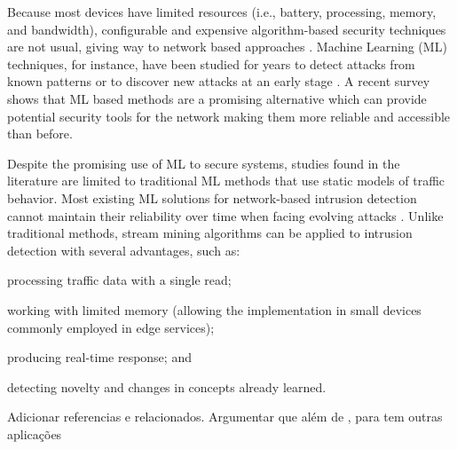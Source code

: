 Because most \iot devices have limited resources (i.e., battery, processing,
memory, and bandwidth), configurable and expensive algorithm-based
security techniques are not usual, giving way to network based approaches 
\cite{Zhou2017}.
Machine Learning (ML) techniques, for instance, have been studied for years to detect attacks
from known patterns or to discover new attacks at an early stage
\cite{buczak2016survey,mitchell2014survey}.
A recent survey \cite{Tahsien2020} shows that ML based methods are a
promising alternative which can provide potential security tools for the \iot
network making them more reliable and accessible than before.

Despite the promising use of ML to secure \iot systems, studies found in the
literature \cite{buczak2016survey,mitchell2014survey,Tahsien2020} are limited to
traditional ML methods that use static models of traffic behavior.
Most existing ML solutions for network-based intrusion detection cannot maintain
their reliability over time when facing evolving attacks \cite{Viegas2019}.
Unlike traditional methods, stream mining algorithms can be applied to intrusion
detection with several advantages, such as:
\begin{enumerate*}[label=(\emph{\roman*})]
    \item processing traffic data with a single read;
    \item working with limited memory (allowing the implementation in small
    devices commonly employed in edge services);
    \item producing real-time response; and
    \item detecting novelty and changes in concepts already learned.
\end{enumerate*}


{\color{red} Adicionar referencias e relacionados. Argumentar que além de \nids,
\nd para \iot tem outras aplicações}

